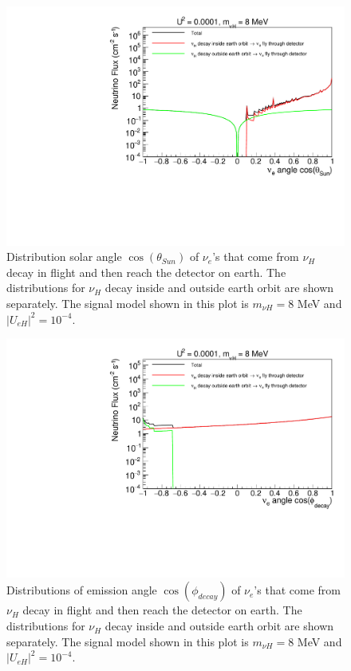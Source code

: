 \documentclass[%
 reprint,
 amsmath,amssymb,
 aps,
 prd,
floatfix,
twocolumn,
]{revtex4-1}
\begin{document}
\begin{figure}[!htbp]
\includegraphics[width=0.99\columnwidth]{../plots/DecayInFlightNuLCosthetaSun_U0.0001_M8.0_InsideOutside_linXlogY.pdf}
\caption{Distribution solar angle $\cos(\theta_{Sun})$ of $\nu_e$'s that come from $\nu_H$ decay in flight and then reach the detector on earth. The distributions for $\nu_H$ decay inside and outside earth orbit are shown separately. The signal model shown in this plot is $m_{\nu H} = 8$ MeV and $|U_{eH}|^2 = 10^{-4}$.}
\label{fig:DecayInFlightTheta_U0.0001_M8} 
\end{figure}


\begin{figure}[!htbp]
\includegraphics[width=0.99\columnwidth]{../plots/DecayInFlightNuLCosphiSun_U0.0001_M8.0_InsideOutside_linXlogY.pdf}
\caption{Distributions of emission angle $\cos(\phi_{decay})$ of $\nu_e$'s that come from $\nu_H$ decay in flight and then reach the detector on earth. The distributions for $\nu_H$ decay inside and outside earth orbit are shown separately. The signal model shown in this plot is $m_{\nu H} = 8$ MeV and $|U_{eH}|^2 = 10^{-4}$.}
\label{fig:DecayInFlightPhi_U0.0001_M8} 
\end{figure}
\end{document}
